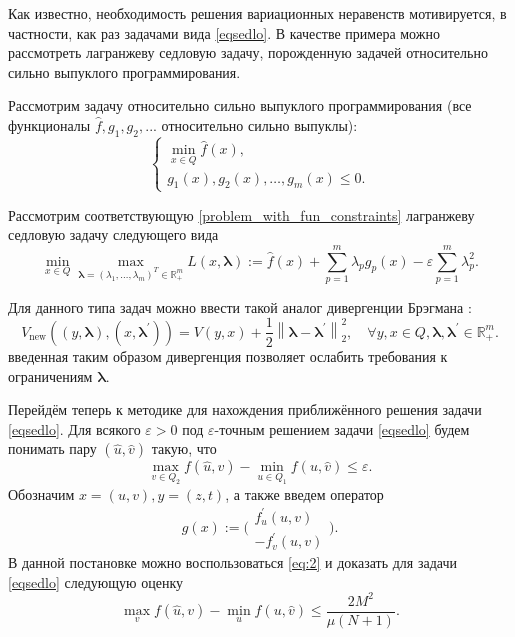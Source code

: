 Как известно, необходимость решения вариационных неравенств мотивируется, в частности, как раз задачами вида \eqref{eqsedlo}. В качестве примера можно рассмотреть лагранжеву седловую задачу, порожденную задачей относительно сильно выпуклого программирования.  
\begin{example} Рассмотрим задачу относительно сильно выпуклого программирования (все функционалы $\widehat{f}, g_1, g_2, ...$ относительно сильно выпуклы):
    \begin{equation}\label{problem_with_fun_constraints}
        \left\{\begin{array}{c}
        \min_{x \in Q} \widehat{f}(x), \\
        g_{1}(x), g_{2}(x), \ldots, g_{m}(x) \leq 0.
        \end{array}\right.
    \end{equation}
        
    Рассмотрим соответствующую \eqref{problem_with_fun_constraints} лагранжеву седловую задачу следующего вида
    \begin{equation}\label{lagrange_problem}
        \min_{x \in Q} \max_{ \boldsymbol{\lambda}= (\lambda_1, \ldots, \lambda_m)^T \in \mathbb{R}_+^m} L(x, \boldsymbol{\lambda}) :=  \widehat{f}(x) + \sum_{p=1}^{m} \lambda_p g_p(x) - \varepsilon \sum_{p=1}^m \lambda_{p}^2.
    \end{equation}
\end{example}
Для данного типа задач можно ввести такой аналог дивергенции Брэгмана \cite{Fedor_relative_adapuniv}:
$$
    V_{\text{new}}\left((y, \boldsymbol{\lambda}), (x, \boldsymbol{\lambda}^{'})\right) = V(y,x) + \frac{1}{2} \left\|\boldsymbol{\lambda} - \boldsymbol{\lambda}^{'}\right\|_2^2, \quad  \forall y, x \in Q, \boldsymbol{\lambda},  \boldsymbol{\lambda}^{'} \in \mathbb{R}_+^m.
$$
введенная таким образом дивергенция позволяет ослабить требования к ограничениям $\boldsymbol{\lambda}$.

Перейдём теперь к методике для нахождения приближённого решения задачи \eqref{eqsedlo}. Для всякого $\varepsilon > 0$ под $\varepsilon$-точным решением задачи \eqref{eqsedlo} будем понимать пару $(\widehat{u}, \widehat{v})$ такую, что $$\max_{v \in Q_2} f(\widehat{u}, v) - \min_{u \in Q_1} f(u, \widehat{v}) \leq \varepsilon.$$ Обозначим $x = (u, v), y = (z, t)$, а также введем оператор 
\begin{equation}\label{operator-sedlo}
    g(x) := \Bigg( 
    \begin{aligned}
        f^{'}_{u}(u,v)\\
        -f^{'}_{v}(u,v)
    \end{aligned}
    \Bigg).
\end{equation}
В данной постановке можно воспользоваться \eqref{eq:2} и доказать для задачи \eqref{eqsedlo} следующую оценку
\begin{equation}
    \max_{v} f(\widehat{u}, v) - \min_{u} f(u, \widehat{v}) \leq \frac{2M^2}{\mu (N+1)}.
\end{equation}

